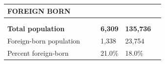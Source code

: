 \documentclass[9pt]{report}
\begin{document}
\newpage
\setlength{\tabcolsep}{.01in} %
\begin{tabular}{p{.10in}p{.10in}p{.10in}p{3.7in}>{\hfill}p{.85in}>{\hfill}p{.85in}>{\hfill}p{.85in}>{\hfill}p{.85in}p{0.1in}}
\multicolumn{9}{l}{\parbox{7.1in}{\raggedright{\large{\strut\textbf{FOREIGN BORN}\strut}}}} \\ 
\hline
\multicolumn{4}{l}{\parbox{3.5in}{\raggedright{\textbf{}}}} & \multicolumn{1}{r}{\parbox{.85in}{\strut\raggedleft{\textbf{}\strut}}} & \multicolumn{1}{r}{\parbox{.85in}{\strut\raggedleft{\textbf{}\strut}}} & \multicolumn{1}{r}{\parbox{.85in}{\strut{}}} & \multicolumn{1}{r}{\parbox{.85in}{\strut{}}} & \\ 
\multicolumn{9}{l}{} \\ 
\multicolumn{4}{l}{\parbox{3.5in}{\strut\raggedright{\textbf{Total population}\strut}}} & \textbf{} & \textbf{} & \textbf{6,309} & \textbf{135,736} & \textbf{} \\ 
\multicolumn{4}{l}{\parbox{3.6in}{\strut\raggedright{{Foreign-born population}}\strut}} &  &  & 1,338 & 23,754 & \multicolumn{1}{l}{}  \\ 
\multicolumn{4}{l}{\parbox{3.6in}{\strut\raggedright{{Percent foreign-born}}\strut}} &  &  & 21.0\% & 18.0\% & \multicolumn{1}{l}{}  \\ 

\end{tabular}
\setlength{\tabcolsep}{6pt} %
\end{document}
